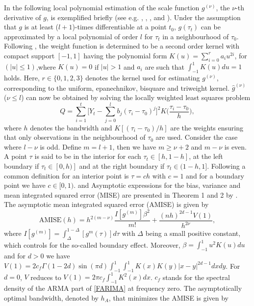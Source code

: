 \documentclass[12pt]{article}
\begin{document}
In the following local polynomial estimation of the scale function $g^{(\nu)}$, the $\nu$-th derivative of $g$, is exemplified briefly (see e.g. \cite{beran2002iterative}, \cite{beran2002local}, \cite{beran2002semifar}, and \cite{beran2013limit}). Under the assumption that $g$ is at least ($l+1$)-times differentiable at a point $t_0$, $g(\tau_t)$ can be approximated by a local polynomial of order $l$ for $\tau_t$ in a neighbourhood of $\tau_0$. Following \citet{gasser1979kernel}, the weight function is determined to be a second order kernel with compact support $[-1,1]$ having the polynomial form $K(u)=\sum_{i=0}^{r}a_i u^{2i}$, for $(|u|\leq1)$,where $K(u)=0$ if $|u|>1$ and $a_i$ are such that $\int_{-1}^{1}K(u)du=1$ holds.  Here, $r \in \{0,1,2,3\}$ denotes the kernel used for estimating $g^{(\nu)}$, corresponding to the uniform, epanechnikov, bisquare and triweight kernel.
$\hat{g}^{(\nu)}$ ($\nu\leq l$) can now be obtained by solving the locally weighted least squares problem
\begin{equation}
\label{LP}
Q=\sum_{i=1}^{t}\Bigg[Y_t-\sum_{j=0}^{l}b_j(\tau_i-\tau_0)^j\Bigg]^2 K\Big(\frac{\tau_i-\tau_0}{h}\Big),	
\end{equation}
where $h$ denotes the bandwidth and $K[(\tau_i-\tau_0)/h]$ are the weights ensuring that only observations in the neighbourhood of $\tau_0$ are used. Consider the case where $l-\nu$ is odd. Define $m=l+1$, then we have $m \geq \nu + 2$ and $m-\nu$ is even. A point $\tau$ is said to be in the interior for each $\tau_t\in [h,1-h]$, at the left boundary if $\tau_t\in [0,h)]$ and at the right boundary if $\tau_t\in (1-h,1]$. Following \citet{beran2002local} a common definition for an interior point is $\tau=ch$ with $c=1$ and for a boundary point we have $c \in [0,1)$.   
\citet{beran2002iterative} and \citet{beran2002local}  Asymptotic expressions for the bias, variance and mean integrated squared error (MISE) are presented in Theorem 1 and 2 by \citet{beran2002local}. The asymptotic mean integrated squared error (AMISE) is given by
\begin{equation}
	\label{AMISE}
	\text{AMISE}(h) = h^{2(m-\nu)} \frac{I[g^{(m)}]\beta^2}{m!} + \frac{(nh)^{2d-1}V(1)}{h^{2\nu}},
\end{equation}
where $I[g^{(m)}] = \int_{\Delta}^{1-\Delta}[g^{m}(\tau)]d\tau$ with $\Delta$ being a small positive constant, which controls for the so-called boundary effect. Moreover, $\beta = \int_{-1}^{1}u^2K(u)du$ and for $d > 0 $ we have $V(1)=2c_f \Gamma(1-2d)\sin (\pi d) \int_{-1}^{1} \int_{-1}^{1} K(x)K(y)|x-y|^{2d-1}dxdy$. For $d = 0$, $V$ reduces to $V(1)=2\pi c_f \int_{-1}^{1}K^2(x)dx$. $c_f$ stands for the spectral density of the ARMA part of \eqref{FARIMA} at frequency zero. The asymptotically optimal bandwidth, denoted by $h_A$, that minimizes the AMISE is given by
\end{document}
